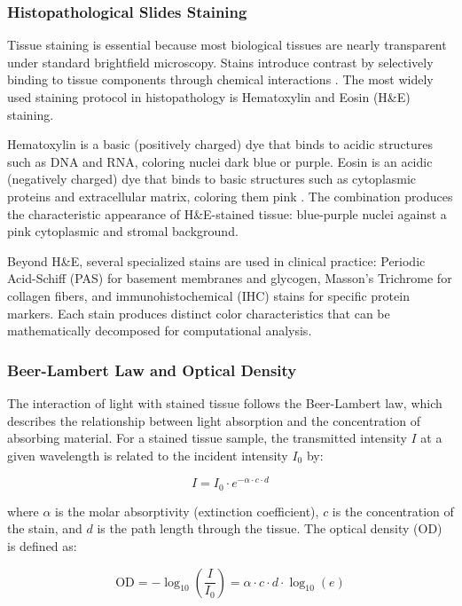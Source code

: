 \subsubsection{Histopathological Slides Staining}

Tissue staining is essential because most biological tissues are nearly transparent under standard brightfield microscopy. Stains introduce contrast by selectively binding to tissue components through chemical interactions \cite{feldman2014he}. The most widely used staining protocol in histopathology is Hematoxylin and Eosin (H\&E) staining.

Hematoxylin is a basic (positively charged) dye that binds to acidic structures such as DNA and RNA, coloring nuclei dark blue or purple. Eosin is an acidic (negatively charged) dye that binds to basic structures such as cytoplasmic proteins and extracellular matrix, coloring them pink \cite{feldman2014he}. The combination produces the characteristic appearance of H\&E-stained tissue: blue-purple nuclei against a pink cytoplasmic and stromal background.

Beyond H\&E, several specialized stains are used in clinical practice: Periodic Acid-Schiff (PAS) for basement membranes and glycogen, Masson's Trichrome for collagen fibers, and immunohistochemical (IHC) stains for specific protein markers. Each stain produces distinct color characteristics that can be mathematically decomposed for computational analysis.

\subsubsection{Beer-Lambert Law and Optical Density}

The interaction of light with stained tissue follows the Beer-Lambert law, which describes the relationship between light absorption and the concentration of absorbing material. For a stained tissue sample, the transmitted intensity $I$ at a given wavelength is related to the incident intensity $I_0$ by:

\begin{equation}
	I = I_0 \cdot e^{-\alpha \cdot c \cdot d}
\end{equation}

where $\alpha$ is the molar absorptivity (extinction coefficient), $c$ is the concentration of the stain, and $d$ is the path length through the tissue. The optical density (OD) is defined as:

\begin{equation}
	\text{OD} = -\log_{10}\left(\frac{I}{I_0}\right) = \alpha \cdot c \cdot d \cdot \log_{10}(e)
\end{equation}

